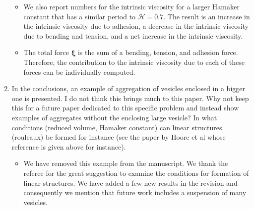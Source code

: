 \documentclass[11pt]{article}
\newcommand{\comment}[1]{{\color{blue} #1}}
\newcommand{\xxi}{\boldsymbol{\xi}}
\begin{document}
\begin{enumerate}
\begin{itemize}
  \item We also report numbers for the intrinsic viscosity for a larger
    Hamaker constant that has a similar period to $\mathcal{H} = 0.7$.
    The result is an increase in the intrinsic viscosity due to
    adhesion, a decrease in the intrinsic viscosity due to bending and
    tension, and a net increase in the intrinsic viscosity.

  \item The total force $\xxi$ is the sum of a bending, tension, and
    adhesion force.  Therefore, the contribution to the intrinsic
    viscosity due to each of these forces can be individually computed.
\end{itemize}

\item\comment{In the conclusions, an example of aggregation of vesicles enclosed
in a bigger one is presented. I do not think this brings much to this
paper. Why not keep this for a future paper dedicated to this specific
problem and instead show examples of aggregates without the enclosing
large vesicle? In what conditions (reduced volume, Hamaker constant)
can linear structures (rouleaux) be formed for instance (see the paper
by Hoore et al whose reference is given above for instance).}
\begin{itemize}
  \item We have removed this example from the manuscript.  We thank the referee for the great suggestion to examine the conditions for formation of
  linear structures. We have added a few new results in the revision and consequently we
    mention that future work includes a suspension of many vesicles.
\end{itemize}

\end{enumerate}
\end{document}
